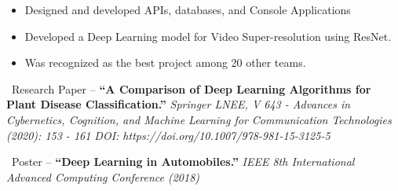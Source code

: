 \documentclass[10pt,a4paper,ragged2e]{altacv}
\begin{document}



\smallskip
{}
\begin{itemize}
    \item Designed and developed APIs, databases, and Console Applications
\end{itemize}
\smallskip
{}
\begin{itemize}
    \item Developed a Deep Learning model for Video Super-resolution using ResNet.
    \item Was recognized as the best project among 20 other teams.
\end{itemize}
 
 \smallskip
 \large{\faFileTextO \ Research Paper}
--
 \normalsize
 \smallskip
 \textbf{“A Comparison of Deep Learning Algorithms for Plant Disease Classification.”}
 \linebreak
 \emph{Springer LNEE, V 643 -  Advances in Cybernetics, Cognition, and Machine Learning for Communication Technologies (2020): 153 - 161\linebreak
DOI: https://doi.org/10.1007/978-981-15-3125-5}

\smallskip
 \large{\faFileTextO \ Poster}
--
 \normalsize
 \smallskip
 \textbf{
“Deep Learning in Automobiles.”}
\linebreak
 \emph{IEEE 8th International Advanced Computing Conference (2018)}






\end{document}
